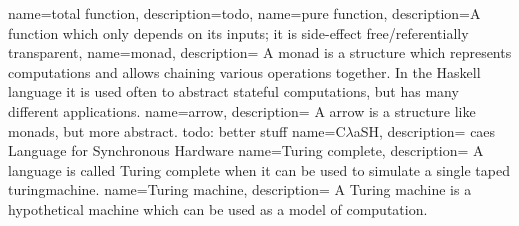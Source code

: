 {
  name={total function},
  description={todo},
}
{
  name={pure function},
  description={A function which only depends on its inputs; it is side-effect free/referentially transparent},
}
{
  name={monad},
  description={ A monad is a structure which represents computations and allows chaining various operations together. 
                In the Haskell language it is used often to abstract stateful computations, but has many different applications.}
}
{
  name={arrow},
  description={ A arrow is a structure like \glspl{monad}, but more abstract.  
                todo: better stuff} 
}
{
  name={C$\lambda$aSH},
  description={ \gls{caes} Language for Synchronous Hardware}
} 
{
  name={Turing complete},
  description={ A language is called Turing complete when it can be used to simulate a single taped \gls{turingmachine}.}
}
{
  name={Turing machine},
  description={ A Turing machine is a hypothetical machine which can be used as a model of computation.}
}
\makeglossary
